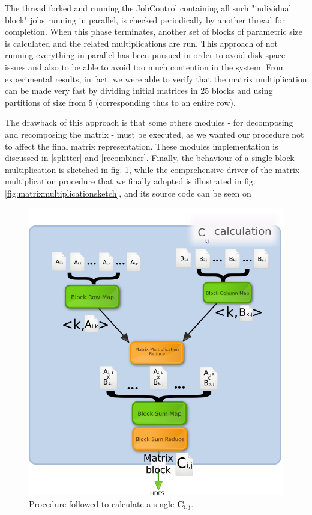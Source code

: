 The thread forked and running the JobControl containing all such "individual block" jobs running in parallel, is checked periodically by another thread for completion. When this phase terminates, another set of blocks of parametric size
is calculated and the related multiplications are run.
This approach of not running everything in parallel has been pursued in order to avoid disk space issues and also to be 
able to avoid too much contention in the system.
From experimental results, in fact, we were able to verify that the matrix multiplication can be made very fast by dividing
initial matrices in 25 blocks and using partitions of size from 5 (corresponding thus to an entire row).

The drawback of this approach is that some others modules - for decomposing and recomposing the matrix - must be executed, as we wanted our procedure not to affect the final matrix representation.
These modules implementation is discussed in \ref{splitter} and \ref{recombiner}.
Finally, the behaviour of a single block multiplication is sketched in fig. \ref{fig:blockmultiplicationsketch}, while
the comprehensive driver of the matrix multiplication procedure that we finally adopted is illustrated in fig. \ref{fig:matrixmultiplicationsketch}, and its source code can be seen on %

\begin{figure}[H]
\centering
\includegraphics[scale=0.7]{blockmultiplication.png}
\caption{Procedure followed to calculate a single $\mathbf{C_{i,j}}$.}
\label{fig:blockmultiplicationsketch}
\end{figure}


